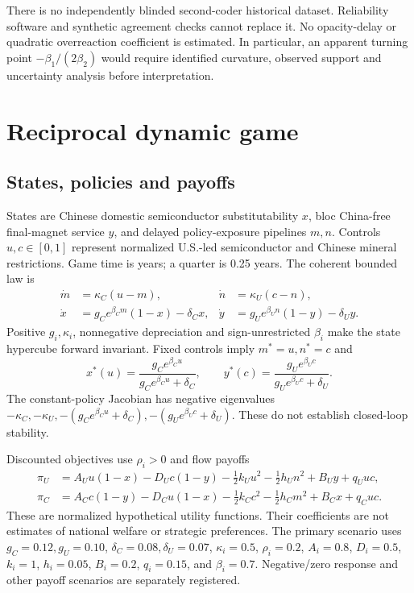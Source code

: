 \documentclass[11pt]{article}
\begin{document}
There is no independently blinded second-coder historical dataset. Reliability software and synthetic agreement checks cannot replace it. No opacity-delay or quadratic overreaction coefficient is estimated. In particular, an apparent turning point $-\beta_1/(2\beta_2)$ would require identified curvature, observed support and uncertainty analysis before interpretation.

\section{Reciprocal dynamic game}
\subsection{States, policies and payoffs}
States are Chinese domestic semiconductor substitutability $x$, bloc China-free final-magnet service $y$, and delayed policy-exposure pipelines $m,n$. Controls $u,c\in[0,1]$ represent normalized U.S.-led semiconductor and Chinese mineral restrictions. Game time is years; a quarter is 0.25 years. The coherent bounded law is
\begin{align}
 \dot m&=\kappa_C(u-m),&\dot n&=\kappa_U(c-n),\\
 \dot x&=g_Ce^{\beta_Cm}(1-x)-\delta_Cx,&
 \dot y&=g_Ue^{\beta_Un}(1-y)-\delta_Uy.
\end{align}
Positive $g_i,\kappa_i$, nonnegative depreciation and sign-unrestricted $\beta_i$ make the state hypercube forward invariant. Fixed controls imply $m^*=u,n^*=c$ and
\begin{equation}
 x^*(u)=\frac{g_Ce^{\beta_Cu}}{g_Ce^{\beta_Cu}+\delta_C},\qquad
 y^*(c)=\frac{g_Ue^{\beta_Uc}}{g_Ue^{\beta_Uc}+\delta_U}.
\end{equation}
The constant-policy Jacobian has negative eigenvalues $-\kappa_C,-\kappa_U,-(g_Ce^{\beta_Cu}+\delta_C),-(g_Ue^{\beta_Uc}+\delta_U)$. These do not establish closed-loop stability.

Discounted objectives use $\rho_i>0$ and flow payoffs
\begin{align}
 \pi_U&=A_Uu(1-x)-D_Uc(1-y)-\tfrac12k_Uu^2-\tfrac12h_Un^2+B_Uy+q_Uuc,\\
 \pi_C&=A_Cc(1-y)-D_Cu(1-x)-\tfrac12k_Cc^2-\tfrac12h_Cm^2+B_Cx+q_Cuc.
\end{align}
These are normalized hypothetical utility functions. Their coefficients are not estimates of national welfare or strategic preferences. The primary scenario uses $g_C=0.12,g_U=0.10$, $\delta_C=0.08,\delta_U=0.07$, $\kappa_i=0.5$, $\rho_i=0.2$, $A_i=0.8$, $D_i=0.5$, $k_i=1$, $h_i=0.05$, $B_i=0.2$, $q_i=0.15$, and $\beta_i=0.7$. Negative/zero response and other payoff scenarios are separately registered.
\end{document}
